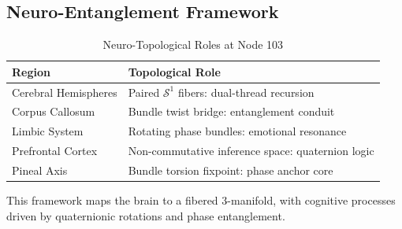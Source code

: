 \documentclass[12pt]{article}
\newcommand{\Ss}{\mathcal{S}}
\begin{document}
\subsection{Neuro-Entanglement Framework}
\begin{table}
\centering
\caption{Neuro-Topological Roles at Node 103}
\begin{tabular}{ll|}
\toprule
\textbf{Region} & \textbf{Topological Role} \\
\midrule
Cerebral Hemispheres & Paired $\Ss^1$ fibers: dual-thread recursion \\
Corpus Callosum & Bundle twist bridge: entanglement conduit \\
Limbic System & Rotating phase bundles: emotional resonance \\
Prefrontal Cortex & Non-commutative inference space: quaternion logic \\
Pineal Axis & Bundle torsion fixpoint: phase anchor core \\
\bottomrule
\end{tabular}
\end{table}
This framework maps the brain to a fibered 3-manifold, with cognitive processes driven by quaternionic rotations and phase entanglement.

\end{document}
